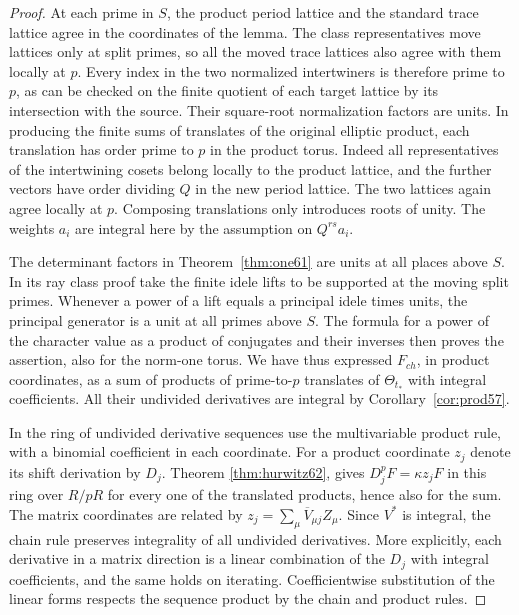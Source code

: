 \documentclass[a4paper,11pt]{article}
\theoremstyle{definition}
\theoremstyle{remark}
\numberwithin{equation}{section}
\begin{document}
\begin{proof}
At each prime in \(S\), the product period lattice and the
standard trace lattice agree in the coordinates of the lemma.
The class representatives move lattices only at split primes,
so all the moved trace lattices also agree with them locally at
\(p\). Every index in the two normalized intertwiners is
therefore prime to \(p\), as can be checked on the finite quotient
of each target lattice by its intersection with the source.
Their square-root normalization factors are units. In producing
the finite sums of translates of the original elliptic product,
each translation has order prime to \(p\) in the product torus.
Indeed all representatives of the intertwining cosets belong
locally to the product lattice, and the further vectors have
order dividing \(Q\) in the new period lattice. The two lattices
again agree locally at \(p\). Composing translations only introduces
roots of unity. The weights \(a_i\) are integral here by the
assumption on \(Q^{rs}a_i\).

The determinant factors in Theorem~\ref{thm:one61} are units at
all places above \(S\). In its ray class proof take the finite
idele lifts to be supported at the moving split primes. Whenever
a power of a lift equals a principal idele times units, the
principal generator is a unit at all primes above \(S\).
The formula for a power of the character value as a product of
conjugates and their inverses then proves the assertion, also for
the norm-one torus. We have thus expressed \(F_{ch}\), in product
coordinates, as a sum of products of prime-to-\(p\) translates of
\(\Theta_{t_*}\) with integral coefficients. All their undivided
derivatives are integral by Corollary~\ref{cor:prod57}.

In the ring of undivided derivative sequences use the
multivariable product rule, with a binomial coefficient in each
coordinate. For a product coordinate \(z_j\) denote its shift
derivation by \(D_j\). Theorem \ref{thm:hurwitz62}, gives
\(D_j^p F=\kappa z_j F\) in this ring over \(R/pR\) for every
one of the translated products, hence also for the sum.
The matrix coordinates are related by
\(z_j=\sum_\mu\overline V_{\mu j}Z_\mu\).
Since \(V^*\) is integral, the chain rule preserves integrality
of all undivided derivatives. More explicitly, each derivative
in a matrix direction is a linear combination of the \(D_j\)
with integral coefficients, and the same holds on iterating.
Coefficientwise substitution of the linear forms respects the
sequence product by the chain and product rules.


\end{proof}
\end{document}
